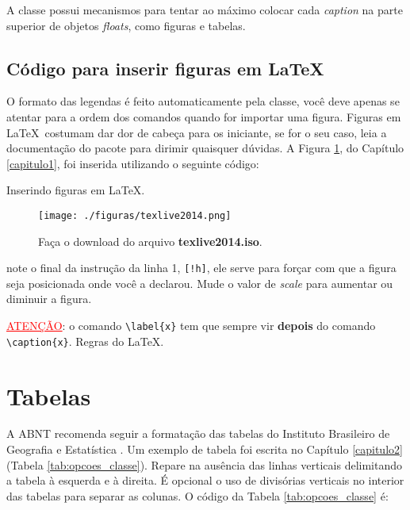 A classe possui mecanismos para tentar ao máximo colocar cada \emph{caption} na parte superior de objetos \emph{floats}, como figuras e tabelas.

\subsection{Código para inserir figuras em \LaTeX\ }

O formato das legendas é feito automaticamente pela classe, você deve apenas se atentar para a ordem dos comandos quando for importar uma figura. Figuras em \LaTeX\ costumam dar dor de cabeça para os iniciante, se for o seu caso, leia a documentação do pacote  para dirimir quaisquer dúvidas. A Figura \ref{texlive2014}, do Capítulo \ref{capitulo1}, foi inserida utilizando o seguinte código:

\begin{codigo}{}{Inserindo figuras em \LaTeX.}
\begin{figure}[!ht]
\centering
\caption{Faça o download do arquivo \textbf{texlive2014.iso}.}
\label{texlive2014}
\texttt{[image: ./figuras/texlive2014.png]}
\end{figure}
\end{codigo}

\noindent
note o final da instrução da linha 1, \texttt{[!h]}, ele serve para forçar com que a figura seja posicionada onde você a declarou. Mude o valor de \emph{scale} para aumentar ou diminuir a figura.

\vspace{20pt}
\noindent
\textcolor{red}{\uline{ATENÇÃO}}: o comando \Verb+\label{x}+ tem que sempre vir \textbf{depois} do comando \Verb+\caption{x}+. Regras do \LaTeX.
\vspace{10pt}

\section{Tabelas}

A ABNT recomenda seguir a formatação das tabelas do Instituto Brasileiro de Geografia e Estatística \cite{ibge:1993}. Um exemplo de tabela foi escrita no Capítulo \ref{capitulo2} (Tabela \ref{tab:opcoes_classe}). Repare na ausência das linhas verticais delimitando a tabela à esquerda e à direita. É opcional o uso de divisórias verticais no interior das tabelas para separar as colunas. O código da Tabela \ref{tab:opcoes_classe} é:


